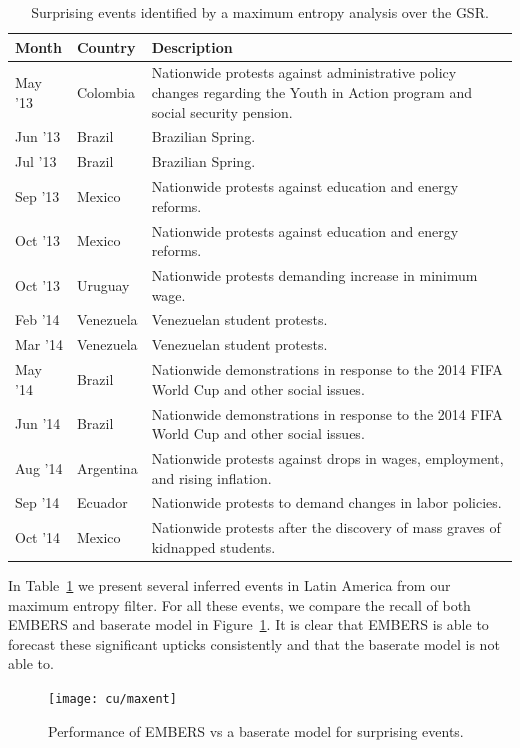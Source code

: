 \begin{table}
  \small
\caption{Surprising events identified by a maximum entropy analysis
over the GSR.}
\renewcommand{\arraystretch}{1.1}
 \centering
 \begin{tabular}{|l|l|m{5cm}|}
 \hline
Month     & Country      & Description \\ \hline
May '13  &  Colombia	 &  Nationwide protests against administrative policy changes regarding the
Youth in Action program and social security pension. \\ \hline
Jun '13  &  Brazil  &  Brazilian Spring. \\ \hline
Jul '13  &  Brazil  &  Brazilian Spring. \\ \hline
Sep '13  &  Mexico  &  Nationwide protests against education and energy 
reforms. \\ \hline
Oct '13  &  Mexico  &  Nationwide protests against education and energy 
reforms. \\ \hline
Oct '13  &  Uruguay  &  Nationwide protests demanding increase in minimum 
wage. \\ \hline
Feb '14  &  Venezuela	  &  Venezuelan student protests. \\ \hline
Mar '14  &  Venezuela  &  	Venezuelan student protests. \\ \hline
May '14  &  Brazil  &  Nationwide demonstrations in response to the 
2014 FIFA World Cup and other social issues. \\ \hline
Jun '14  &  Brazil  &  Nationwide demonstrations in response to the 2014 FIFA World Cup and other social issues. \\ \hline
Aug '14  &  Argentina	  &  Nationwide protests against drops in wages, employment, and rising inflation. \\ \hline
Sep '14  &  Ecuador  &  Nationwide protests to demand changes in 
labor policies. \\ \hline
Oct '14  &  Mexico  &  Nationwide protests after the discovery of mass 
graves of kidnapped students. \\ \hline
\end{tabular}
\label{tab:maxentEvents}
\end{table}

In Table~\ref{tab:maxentEvents} we present several inferred events in Latin America from our maximum entropy
filter.
For all these events, we compare the recall of both EMBERS and baserate model
in Figure~\ref{fig:maxent}.
It is clear that EMBERS is able to forecast these significant upticks consistently and that the baserate model is not able to.

\begin{figure} %
\centering
\texttt{[image: cu/maxent]}
\caption{Performance of EMBERS vs a baserate model for surprising events.}
\label{fig:maxent}
\end{figure}
